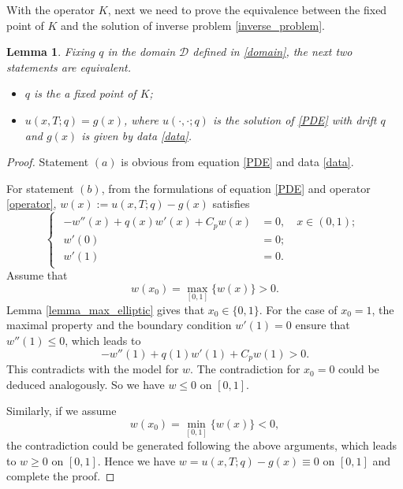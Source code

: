 \documentclass[11pt]{article}
\newtheorem{lemma}{Lemma}[section]
\numberwithin{equation}{section}
\begin{document}
With the operator $K$, next we need to prove the equivalence between the fixed point of $K$ and the solution of inverse problem \eqref{inverse_problem}. 
\begin{lemma}\label{lemma_equivalence}
 Fixing $q$ in the domain $\mathcal D$ defined in \eqref{domain}, the next two statements are equivalent.
\begin{itemize}
\item[(a)] $q$ is the a fixed point of $K$; 
\item[(b)] $u(x,T;q)=g(x)$, where $u(\cdot,\cdot;q)$ is the solution of \eqref{PDE} with drift $q$ and $g(x)$ is given by data \eqref{data}.
\end{itemize}

\end{lemma}
\begin{proof}
 Statement $(a)$ is obvious from equation \eqref{PDE} and data \eqref{data}. 
 
 For statement $(b)$, from the formulations of equation \eqref{PDE} and operator \eqref{operator}, $w(x):=u(x,T;q)-g(x)$ satisfies 
 \begin{equation*}
 \begin{cases}
  \begin{aligned}
   -w''(x)+q(x)w'(x)+C_pw(x)&=0,\quad x\in(0,1);\\
   w'(0)&=0;\\
   w'(1)&=0.
  \end{aligned}
 \end{cases}
\end{equation*}
Assume that 
$$w(x_0)=\max_{[0,1]}\{w(x)\}>0.$$
Lemma \ref{lemma_max_elliptic} gives that $x_0\in\{0,1\}$. For the case of $x_0=1$, the maximal property and the boundary condition $w'(1)=0$ ensure that $w''(1)\le 0$, which leads to 
$$-w''(1)+q(1)w'(1)+C_pw(1)>0.$$
This contradicts with the model for $w$. The contradiction for $x_0=0$ could be deduced analogously. So we have $w\le 0$ on $[0,1]$. 

Similarly, if we assume 
$$w(x_0)=\min_{[0,1]}\{w(x)\}<0,$$ 
the contradiction could be generated following the above arguments, which leads to $w\ge 0$ on $[0,1]$. Hence we have $w=u(x,T;q)-g(x)\equiv 0$ on $[0,1]$ and complete the proof. 
\end{proof}
\end{document}
